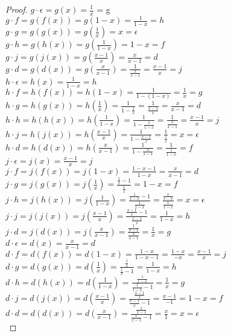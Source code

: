 \documentclass[12pt]{article}
\begin{document}
\begin{enumerate}
\begin{proof}
$g \cdot \epsilon = g(x) = \frac{1}{x}$ = g\\
$g \cdot f = g(f(x)) = g(1-x) = \frac{1}{1-x} = h$\\
$g \cdot g = g(g(x)) = g(\frac{1}{x}) = x = \epsilon$\\
$g \cdot h = g(h(x)) = g(\frac{1}{1-x}) = 1-x = f$ \\
$g \cdot j = g(j(x)) = g(\frac{x-1}{x}) = \frac{x}{x-1}  =d$\\
$g \cdot d = g(d(x)) = g(\frac{x}{x-1}) = \frac{1}{\frac{x}{x-1}} = \frac{x-1}{x} = j$\\

$h \cdot \epsilon = h(x) = \frac{1}{1-x} = h$\\
$h \cdot f = h(f(x)) = h(1-x) = \frac{1}{1-(1-x)} = \frac{1}{x} = g$\\
$h \cdot g = h(g(x)) = h(\frac{1}{x}) = \frac{1}{1-\frac{1}{x}} = \frac{1}{\frac{x-1}{x}}=\frac{x}{x-1}=d$\\
$h \cdot h = h(h(x)) = h(\frac{1}{1-x}) = \frac{1}{1-\frac{1}{1-x}}= \frac{1}{\frac{x}{x-1}}= \frac{x-1}{x}=j$\\
$h \cdot j = h(j(x)) = h(\frac{x-1}{x}) = \frac{1}{1-\frac{x-1}{x}} = \frac{1}{\frac{1}{x}}=x=\epsilon$\\
$h \cdot d = h(d(x)) = h(\frac{x}{x-1}) = \frac{1}{1-\frac{x}{x-1}} = \frac{1}{\frac{1}{1-x}}=f$\\

$j \cdot \epsilon = j(x) = \frac{x-1}{x} = j$\\
$j \cdot f = j(f(x)) = j(1-x) = \frac{1-x-1}{1-x}=  \frac{x}{x-1} = d$\\
$j \cdot g = j(g(x)) = j(\frac{1}{x}) = \frac{\frac{1}{x}-1}{\frac{1}{x}} = 1-x = f$\\
$j \cdot h = j(h(x)) = j(\frac{1}{1-x}) = \frac{\frac{1}{1-x}-1}{\frac{1}{1-x}} = \frac{\frac{x}{1-x}}{\frac{1}{1-x}}=x = \epsilon$\\
$j \cdot j = j(j(x)) = j(\frac{x-1}{x}) = \frac{\frac{x-1}{x}-1}{\frac{x-1}{x}} = \frac{1}{1-x} =h$\\
$j \cdot d = j(d(x)) = j(\frac{x}{x-1}) = \frac{\frac{1}{x-1}}{\frac{x}{x-1}} = \frac{1}{x} =g$\\


$d \cdot \epsilon = d(x) = \frac{x}{x-1} = d$\\
$d \cdot f = d(f(x)) = d(1-x) = \frac{1-x}{1-x-1} = \frac{1-x}{-x} = \frac{x-1}{x} =j$\\
$d \cdot g = d(g(x)) = d(\frac{1}{x}) = \frac{\frac{1}{x}}{\frac{1}{x}-1} = \frac{1}{1-x} =h$\\
$d \cdot h = d(h(x)) = d(\frac{1}{1-x}) = \frac{\frac{1}{1-x}}{\frac{1}{1-x}-1} = \frac{1}{x} =g$\\
$d \cdot j = d(j(x)) = d(\frac{x-1}{x}) = \frac{\frac{x-1}{x}}{\frac{x-1}{x}-1} = \frac{x-1}{-1} = 1-x = f$\\
$d \cdot d = d(d(x))= d(\frac{x}{x-1}) = \frac{\frac{x}{x-1}}{\frac{x}{x-1}-1} = \frac{x}{1} = x =\epsilon$\\




\end{proof}
\end{enumerate}
\end{document}

